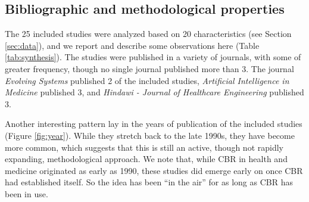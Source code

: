 \documentclass[preprint, 3p,
authoryear]{elsarticle} %
\begin{document}
\hypertarget{bibliographic-and-methodological-properties}{%
\subsection{Bibliographic and methodological
properties}\label{bibliographic-and-methodological-properties}}

The 25 included studies were analyzed based on 20 characteristics (see
Section \ref{sec:data}), and we report and describe some observations
here (Table \ref{tab:synthesis}). The studies were published in a
variety of journals, with some of greater frequency, though no single
journal published more than 3. The journal \emph{Evolving Systems}
published 2 of the included studies, \emph{Artificial Intelligence in
Medicine} published 3, and \emph{Hindawi - Journal of Healthcare
Engineering} published 3.

Another interesting pattern lay in the years of publication of the
included studies (Figure \ref{fig:year}). While they stretch back to the
late 1990s, they have become more common, which suggests that this is
still an active, though not rapidly expanding, methodological approach.
We note that, while CBR in health and medicine originated as early as
1990, these studies did emerge early on once CBR had established itself.
So the idea has been ``in the air'' for as long as CBR has been in use.
\end{document}
